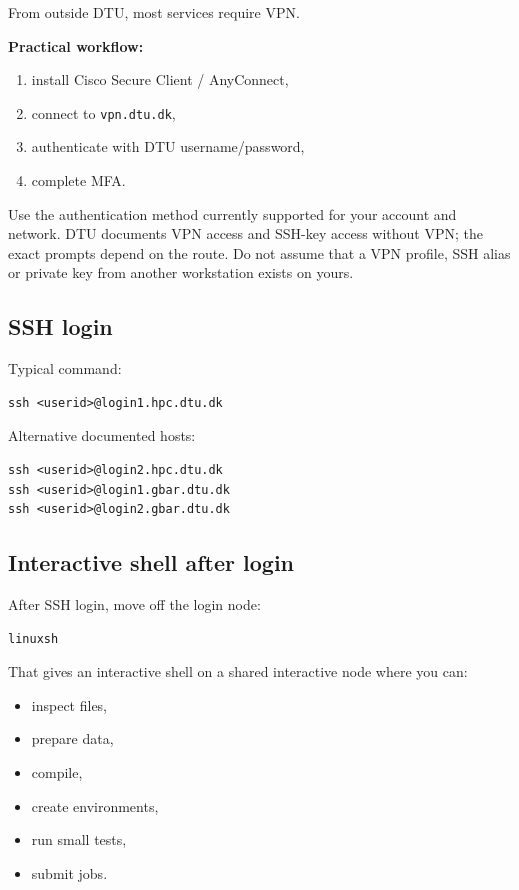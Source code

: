 \documentclass[11pt,a4paper]{article}
\begin{document}
From outside DTU, most services require VPN.

\textbf{Practical workflow:}
\begin{enumerate}[leftmargin=1.5em]
  \item install Cisco Secure Client / AnyConnect,
  \item connect to \texttt{vpn.dtu.dk},
  \item authenticate with DTU username/password,
  \item complete MFA.
\end{enumerate}

Use the authentication method currently supported for your account and network.
DTU documents VPN access and SSH-key access without VPN; the exact prompts depend
on the route. Do not assume that a VPN profile, SSH alias or private key from
another workstation exists on yours.

\subsection{SSH login}

Typical command:

\begin{lstlisting}[style=shell]
ssh <userid>@login1.hpc.dtu.dk
\end{lstlisting}

Alternative documented hosts:

\begin{lstlisting}[style=shell]
ssh <userid>@login2.hpc.dtu.dk
ssh <userid>@login1.gbar.dtu.dk
ssh <userid>@login2.gbar.dtu.dk
\end{lstlisting}

\subsection{Interactive shell after login}

After SSH login, move off the login node:

\begin{lstlisting}[style=shell]
linuxsh
\end{lstlisting}

That gives an interactive shell on a shared interactive node where you can:

\begin{itemize}[leftmargin=1.5em]
  \item inspect files,
  \item prepare data,
  \item compile,
  \item create environments,
  \item run small tests,
  \item submit jobs.
\end{itemize}
\end{document}
